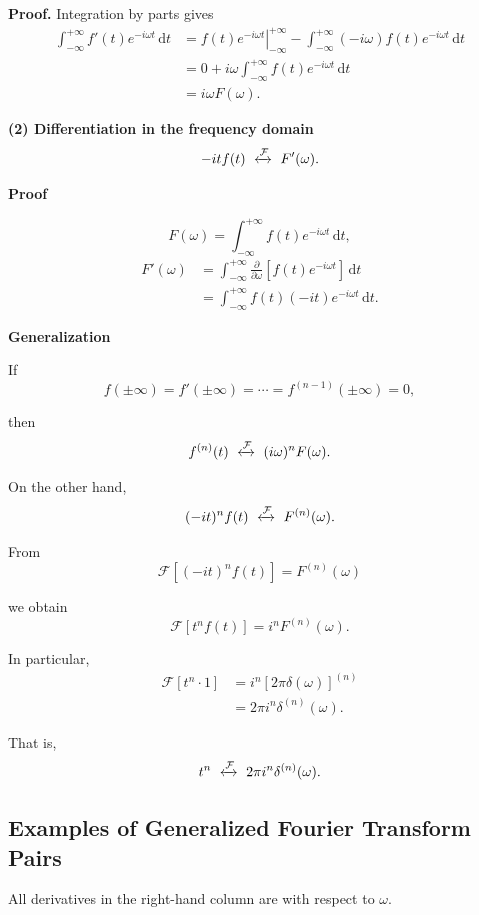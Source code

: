 \documentclass[11pt,a4paper]{article}
\theoremstyle{definition}
\theoremstyle{plain}
\begin{document}
\textbf{Proof.} Integration by parts gives
\[
\begin{aligned}
\int_{-\infty}^{+\infty}f'(t)e^{-i\omega t}\,\mathrm dt
&=\left.f(t)e^{-i\omega t}\right|_{-\infty}^{+\infty}
-\int_{-\infty}^{+\infty}(-i\omega)f(t)e^{-i\omega t}\,\mathrm dt\\
&=0+i\omega\int_{-\infty}^{+\infty}
f(t)e^{-i\omega t}\,\mathrm dt\\
&=i\omega F(\omega).
\end{aligned}
\]

\textbf{(2) Differentiation in the frequency domain}
\[
-itf(t)\ \xleftrightarrow{\mathcal F}\ F'(\omega).
\]

\textbf{Proof}\par\nopagebreak[4]
\[
F(\omega)=\int_{-\infty}^{+\infty}
f(t)e^{-i\omega t}\,\mathrm dt,
\]
\[
\begin{aligned}
F'(\omega)
&=\int_{-\infty}^{+\infty}
\frac{\partial}{\partial\omega}
[f(t)e^{-i\omega t}]\,\mathrm dt\\
&=\int_{-\infty}^{+\infty}
f(t)(-it)e^{-i\omega t}\,\mathrm dt.
\end{aligned}
\]

\textbf{Generalization}\par\nopagebreak[4]
If
\[
f(\pm\infty)=f'(\pm\infty)=\cdots
=f^{(n-1)}(\pm\infty)=0,
\]

then
\[
f^{(n)}(t)\ \xleftrightarrow{\mathcal F}\
(i\omega)^nF(\omega).
\]

On the other hand,
\[
(-it)^nf(t)\ \xleftrightarrow{\mathcal F}\
F^{(n)}(\omega).
\]

From
\[
\mathcal F[(-it)^nf(t)]=F^{(n)}(\omega)
\]

we obtain
\[
\mathcal F[t^nf(t)]=i^nF^{(n)}(\omega).
\]

In particular,
\[
\begin{aligned}
\mathcal F[t^n\cdot1]
&=i^n[2\pi\delta(\omega)]^{(n)}\\
&=2\pi i^n\delta^{(n)}(\omega).
\end{aligned}
\]

That is,
\[
t^n\ \xleftrightarrow{\mathcal F}\
2\pi i^n\delta^{(n)}(\omega).
\]

\subsection{Examples of Generalized Fourier Transform Pairs}

All derivatives in the right-hand column are with respect to \(\omega\).
\end{document}
